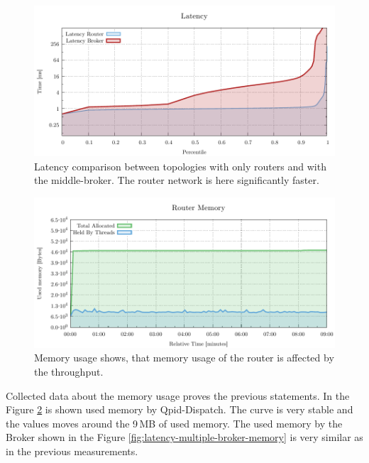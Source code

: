 \begin{figure}[H]
	\centering
	\includegraphics[width=1\linewidth]{obrazky-figures/charts/multipoint-latency.pdf}
	\caption{Latency comparison between topologies with only routers and with the middle-broker. The router network is here significantly faster.}
	\label{fig:latency-multipoint-router}
\end{figure}

\begin{figure}[H]
	\centering
	\includegraphics[width=1\linewidth]{obrazky-figures/charts/multipoint-router-only-latency-memory.pdf}
	\caption{Memory usage shows, that memory usage of the router is affected by the throughput.}
	\label{fig:latency-multiple-router-memory}
\end{figure}

Collected data about the memory usage proves the previous statements. In the Figure \ref{fig:latency-multiple-router-memory} is shown used memory by Qpid-Dispatch. The curve is very stable and the values moves around the 9\,MB of used memory. The used memory by the Broker shown in the Figure \ref{fig:latency-multiple-broker-memory} is very similar as in the previous measurements.

